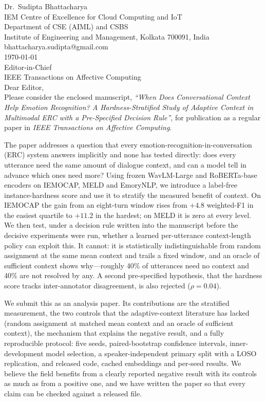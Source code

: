 \documentclass[11pt]{article}
\begin{document}
\noindent Dr.\ Sudipta Bhattacharya\\
IEM Centre of Excellence for Cloud Computing and IoT\\
Department of CSE (AIML) and CSBS\\
Institute of Engineering and Management, Kolkata 700091, India\\
bhattacharya.sudipta@gmail.com\\[1.2em]
\noindent \today\\[1.2em]
\noindent Editor-in-Chief\\
IEEE Transactions on Affective Computing\\[1.5em]

\noindent Dear Editor,\\[0.6em]
Please consider the enclosed manuscript, \emph{``When Does Conversational Context Help Emotion Recognition? A Hardness-Stratified Study of Adaptive Context in Multimodal ERC with a Pre-Specified Decision Rule''}, for publication as a regular paper in \emph{IEEE Transactions on Affective Computing}.

The paper addresses a question that every emotion-recognition-in-conversation (ERC) system answers implicitly and none has tested directly: does every utterance need the same amount of dialogue context, and can a model tell in advance which ones need more? Using frozen WavLM-Large and RoBERTa-base encoders on IEMOCAP, MELD and EmoryNLP, we introduce a label-free instance-hardness score and use it to stratify the measured benefit of context. On IEMOCAP the gain from an eight-turn window rises from $+4.8$ weighted-F1 in the easiest quartile to $+11.2$ in the hardest; on MELD it is zero at every level. We then test, under a decision rule written into the manuscript before the decisive experiments were run, whether a learned per-utterance context-length policy can exploit this. It cannot: it is statistically indistinguishable from random assignment at the same mean context and trails a fixed window, and an oracle of sufficient context shows why---roughly 40\% of utterances need no context and 40\% are not resolved by any. A second pre-specified hypothesis, that the hardness score tracks inter-annotator disagreement, is also rejected ($\rho = 0.04$).

We submit this as an analysis paper. Its contributions are the stratified measurement, the two controls that the adaptive-context literature has lacked (random assignment at matched mean context and an oracle of sufficient context), the mechanism that explains the negative result, and a fully reproducible protocol: five seeds, paired-bootstrap confidence intervals, inner-development model selection, a speaker-independent primary split with a LOSO replication, and released code, cached embeddings and per-seed results. We believe the field benefits from a clearly reported negative result with its controls as much as from a positive one, and we have written the paper so that every claim can be checked against a released file.
\end{document}

